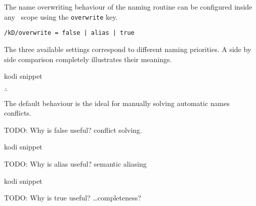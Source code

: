 The name overwriting behaviour of the naming routine can be configured
inside any \koDi\ scope using the \lstinline!overwrite! key.

\begin{lstlisting}
/kD/overwrite = false | alias | true
\end{lstlisting}

The three available settings correspond to different naming priorities.
A side by side comparison completely illustrates their meanings.

\begin{tcblisting}{kodi snippet}
\end{tcblisting}

\hfill$\therefore$\hfill\null

The default behaviour is the ideal for manually solving automatic names
conflicts.

TODO: Why is false useful? conflict solving.

\begin{tcblisting}{kodi snippet}
\end{tcblisting}

TODO: Why is alias useful? semantic aliasing

\begin{tcblisting}{kodi snippet}
\end{tcblisting}

TODO: Why is true useful? \ldots completeness?
